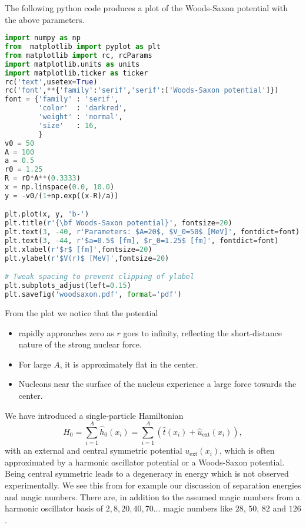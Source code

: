 \documentclass[graybox,sectrefs,envcountresetchap,open=right]{svmonodo}
\begin{document}
The following python code produces a plot of the Woods-Saxon potential with the above parameters. 

\begin{lstlisting}[language=Python,style=blue1bar]
import numpy as np
from  matplotlib import pyplot as plt
from matplotlib import rc, rcParams
import matplotlib.units as units
import matplotlib.ticker as ticker
rc('text',usetex=True)
rc('font',**{'family':'serif','serif':['Woods-Saxon potential']})
font = {'family' : 'serif',
        'color'  : 'darkred',
        'weight' : 'normal',
        'size'   : 16,
        }
v0 = 50
A = 100
a = 0.5
r0 = 1.25
R = r0*A**(0.3333)
x = np.linspace(0.0, 10.0)
y = -v0/(1+np.exp((x-R)/a))

plt.plot(x, y, 'b-')
plt.title(r'{\bf Woods-Saxon potential}', fontsize=20)     
plt.text(3, -40, r'Parameters: $A=20$, $V_0=50$ [MeV]', fontdict=font)
plt.text(3, -44, r'$a=0.5$ [fm], $r_0=1.25$ [fm]', fontdict=font)
plt.xlabel(r'$r$ [fm]',fontsize=20)
plt.ylabel(r'$V(r)$ [MeV]',fontsize=20)

# Tweak spacing to prevent clipping of ylabel
plt.subplots_adjust(left=0.15)
plt.savefig('woodsaxon.pdf', format='pdf')
\end{lstlisting}
From the plot we notice that the potential
\begin{itemize}
\item rapidly approaches zero as $r$ goes to infinity, reflecting the short-distance nature of the strong nuclear force.

\item For large $A$, it is approximately flat in the center.

\item Nucleons near the surface of the nucleus experience a large force towards the center.
\end{itemize}

\noindent
We have introduced a single-particle Hamiltonian
\[
  H_0=\sum_{i=1}^A \hat{h}_0(x_i) =  \sum_{i=1}^A\left(\hat{t}(x_i) + \hat{u}_{\mathrm{ext}}(x_i)\right),
\]
with an external and central symmetric potential $u_{\mathrm{ext}}(x_i)$, which is often 
approximated by a harmonic oscillator potential or a Woods-Saxon potential. Being central symmetric leads to a degeneracy 
in energy which is not observed experimentally. We see this from for example our discussion of separation energies and magic numbers. There are, in addition to the assumed magic numbers from a harmonic oscillator basis of $2,8,20,40,70\dots$ magic numbers like $28$, $50$, $82$ and $126$. 
\end{document}
